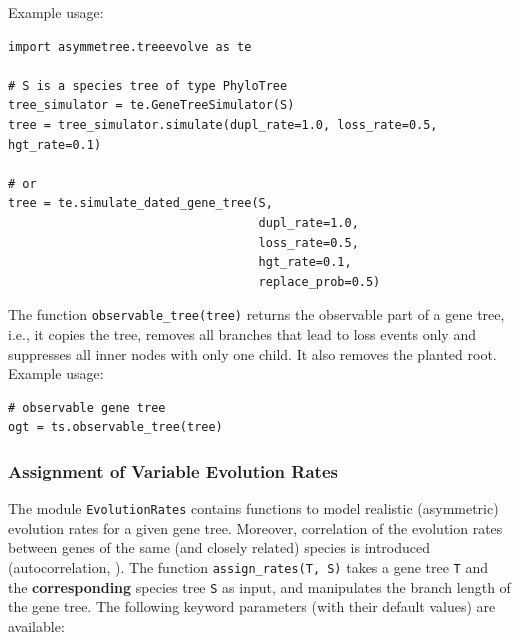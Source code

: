 \documentclass[hidelinks,11pt]{article}
\begin{document}
Example usage:

\begin{adjustwidth}{1cm}{1cm}\vspace{2mm}
\begin{verbatim}
import asymmetree.treeevolve as te

# S is a species tree of type PhyloTree
tree_simulator = te.GeneTreeSimulator(S)
tree = tree_simulator.simulate(dupl_rate=1.0, loss_rate=0.5, hgt_rate=0.1)

# or
tree = te.simulate_dated_gene_tree(S,
                                   dupl_rate=1.0,
                                   loss_rate=0.5,
                                   hgt_rate=0.1,
                                   replace_prob=0.5)
\end{verbatim}
\end{adjustwidth}

The function \texttt{observable\_tree(tree)} returns the observable part of a gene tree, i.e., it copies the tree, removes all branches that lead to loss events only and suppresses all inner nodes with only one child.
It also removes the planted root.
Example usage:
\begin{adjustwidth}{1cm}{1cm}\vspace{2mm}
\begin{verbatim}
# observable gene tree
ogt = ts.observable_tree(tree)
\end{verbatim}
\end{adjustwidth}


\subsubsection{Assignment of Variable Evolution Rates}
\label{sec:evolution_rates}

The module \texttt{EvolutionRates} contains functions to model realistic (asymmetric) evolution rates for a given gene tree.
Moreover, correlation of the evolution rates between genes of the same (and closely related) species is introduced (autocorrelation, \citep{kishino2001}).
The function \texttt{assign\_rates(T, S)} takes a gene tree \texttt{T} and the \textbf{corresponding} species tree \texttt{S} as input, and manipulates the branch length of the gene tree.
The following keyword parameters (with their default values) are available:
\end{document}

